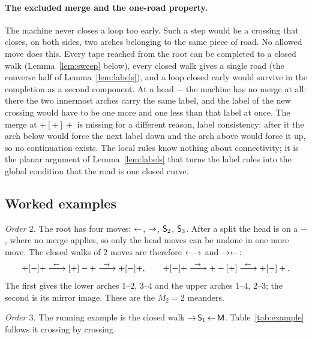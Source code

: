 \paragraph{The excluded merge and the one-road property.}
The machine never closes a loop too early. Such a step would be a crossing that closes, on both sides, two arches
belonging to the same piece of road. No allowed move does this. Every tape reached from the root can be completed to a closed walk
(Lemma~\ref{lem:sweep} below), every closed walk gives a single road (the converse half of
Lemma~\ref{lem:labels}), and a loop closed early would survive in the completion as a second component. At a head
$-$ the machine has no merge at all: there the two innermost arches carry the same label, and the label of the new
crossing would have to be one more and one less than that label at once. The merge at $+[+]+$ is missing for a
different reason, label consistency: after it the arch below would force the next label down and the arch above would
force it up, so no continuation exists. The local rules know nothing about connectivity; it is the planar argument of
Lemma~\ref{lem:labels} that turns the label rules into the global condition that the road is one closed curve.

\subsection{Worked examples}

\emph{Order $2$.} The root has four moves: $\mathord{\leftarrow}$, $\mathord{\rightarrow}$, $\mathsf{S}_2$, $\mathsf{S}_3$. After a split the head is on a $-$,
where no merge applies, so only the head moves can be undone in one more move. The closed walks of $2$ moves are
therefore $\mathord{\leftarrow}\mathord{\rightarrow}$ and $\mathord{\rightarrow}\mathord{\leftarrow}$:
\[ +[-]+ \xrightarrow{\ \mathord{\leftarrow}\ } [+]-+ \xrightarrow{\ \mathord{\rightarrow}\ } +[-]+, \qquad
   +[-]+ \xrightarrow{\ \mathord{\rightarrow}\ } +-[+] \xrightarrow{\ \mathord{\leftarrow}\ } +[-]+ . \]
The first gives the lower arches $1$--$2$, $3$--$4$ and the upper arches $1$--$4$, $2$--$3$; the second is its mirror
image. These are the $M_2=2$ meanders.

\emph{Order $3$.} The running example is the closed walk $\mathord{\rightarrow}\,\mathsf{S}_1\,\mathord{\leftarrow}\,\mathsf{M}$. Table~\ref{tab:example} follows it
crossing by crossing.

